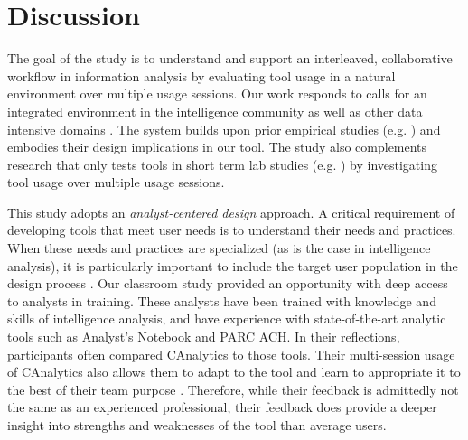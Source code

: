 \section{Discussion}\label{discussion}

The goal of the study is to understand and support an interleaved, collaborative workflow in information analysis by evaluating tool usage in a natural
environment over multiple usage sessions. Our work responds to calls for an
integrated environment in the intelligence community as well as other data
intensive domains \citep{Shah2014i, Chen2016, Vision2015, Amershi2015, Ware2012}.
The system builds upon prior empirical studies (e.g. \cite{Carroll2013,
	Borge2012,Kang2011,Chin2009}) and embodies their design implications in our
tool. The study also complements research that only tests tools in short term
lab studies (e.g. \cite{Convertino2011,Goyal2016,Hajizadeh2013}) by
investigating tool usage over multiple usage sessions.

This study adopts an \emph{analyst-centered design} approach. A critical
requirement of developing tools that meet user needs is to understand their
needs and practices. When these needs and practices are specialized (as is the
case in intelligence analysis), it is particularly important to include the
target user population in the design process \citep{Scholtz2014}. Our classroom
study provided an opportunity with deep access to analysts in training. These
analysts have been trained with knowledge and skills of intelligence analysis,
and have experience with state-of-the-art analytic tools such as Analyst's
Notebook and PARC ACH. In their reflections, participants often compared
CAnalytics to those tools. Their multi-session usage of CAnalytics also allows
them to adapt to the tool and learn to appropriate it to the best of their team
purpose \citep{Stahl2006}. Therefore, while their feedback is admittedly not the
same as an experienced professional, their feedback does provide a deeper
insight into strengths and weaknesses of the tool than average users.

